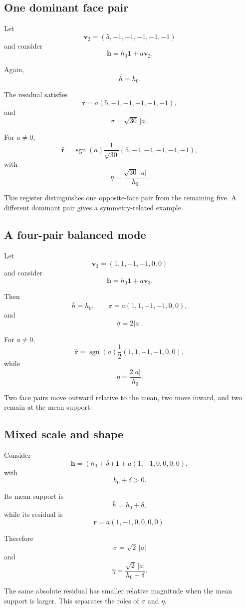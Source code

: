 \subsection{One dominant face pair}

Let
\[
\mathbf v_2
=
(5,-1,-1,-1,-1,-1)
\]
and consider
\[
\mathbf h
=
h_0\mathbf 1+a\mathbf v_2.
\]

Again,
\[
\bar h=h_0.
\]

The residual satisfies
\[
\mathbf r
=
a(5,-1,-1,-1,-1,-1),
\]
and
\[
\sigma
=
\sqrt{30}\,|a|.
\]

For \(a\ne0\),
\[
\widehat{\mathbf r}
=
\operatorname{sgn}(a)
\frac{1}{\sqrt{30}}
(5,-1,-1,-1,-1,-1),
\]
with
\[
\eta
=
\frac{\sqrt{30}\,|a|}{h_0}.
\]

This register distinguishes one opposite-face pair from the remaining five.
A different dominant pair gives a symmetry-related example.

\subsection{A four-pair balanced mode}

Let
\[
\mathbf v_3
=
(1,1,-1,-1,0,0)
\]
and consider
\[
\mathbf h
=
h_0\mathbf 1+a\mathbf v_3.
\]

Then
\[
\bar h=h_0,
\qquad
\mathbf r
=
a(1,1,-1,-1,0,0),
\]
and
\[
\sigma=2|a|.
\]

For \(a\ne0\),
\[
\widehat{\mathbf r}
=
\operatorname{sgn}(a)
\frac{1}{2}
(1,1,-1,-1,0,0),
\]
while
\[
\eta
=
\frac{2|a|}{h_0}.
\]

Two face pairs move outward relative to the mean, two move inward, and two
remain at the mean support.

\subsection{Mixed scale and shape}

Consider
\[
\mathbf h
=
(h_0+\delta)\mathbf 1
+
a(1,-1,0,0,0,0),
\]
with
\[
h_0+\delta>0.
\]

Its mean support is
\[
\bar h=h_0+\delta,
\]
while its residual is
\[
\mathbf r
=
a(1,-1,0,0,0,0).
\]

Therefore
\[
\sigma
=
\sqrt{2}\,|a|
\]
and
\[
\eta
=
\frac{\sqrt{2}\,|a|}{h_0+\delta}.
\]

The same absolute residual has smaller relative magnitude when the mean
support is larger. This separates the roles of \(\sigma\) and \(\eta\).

